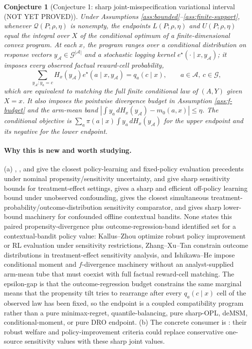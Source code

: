 \documentclass[11pt]{article}
\theoremstyle{definition}
\theoremstyle{plain}
\newtheorem{conjecture}{Conjecture}
\theoremstyle{remark}
\begin{document}
\begin{conjecture}[Conjecture 1: sharp joint-misspecification variational interval (NOT YET PROVED)]\label{conj:sharp-interval}
Under Assumptions \ref{ass:bounded}--\ref{ass:finite-support}, whenever $\mathcal Q(P;\rho,\eta)$ is nonempty, the endpoints $L(P;\rho,\eta)$ and $U(P;\rho,\eta)$ equal the integral over $X$ of the conditional optimum of a finite-dimensional convex program. At each $x$, the program ranges over a conditional distribution on response vectors $y_{\mathcal A}\in\mathcal G^{|\mathcal A|}$ and a stochastic logging kernel $e^\star(\cdot\mid x,y_{\mathcal A})$; it imposes every observed factual reward-cell probability,
\[
  \sum_{y_{\mathcal A}:y_a=c}
    H_x(y_{\mathcal A})e^\star(a\mid x,y_{\mathcal A})
  =q_a(c\mid x),
  \qquad a\in\mathcal A,\ c\in\mathcal G,
\]
which are equivalent to matching the full finite conditional law of $(A,Y)$ given $X=x$. It also imposes the pointwise divergence budget in Assumption \ref{ass:f-budget} and the arm-mean band
$|\int y_a\,dH_x(y_{\mathcal A})-m_0(a,x)|\le\eta$. The conditional objective is
$\sum_a\pi(a\mid x)\int y_a\,dH_x(y_{\mathcal A})$ for the upper endpoint and its negative for the lower endpoint.
\end{conjecture}
\paragraph{Why this is new and worth studying.}
(a) \citet{KallusZhou2018}, \citet{KallusZhou2020}, and \citet{KallusZhou2021} give the closest policy-learning and fixed-policy evaluation precedents under nominal propensity/sensitivity uncertainty, \citet{DornGuo2023} and \citet{DornGuoKallus2025} give sharp sensitivity bounds for treatment-effect settings, \citet{HessFrauenMelnychukFeuerriegel2026} gives a sharp and efficient off-policy learning bound under unobserved confounding, \citet{ZhangXuTan2025} gives the closest simultaneous treatment-probability/outcome-distribution sensitivity comparator, and \citet{IshikawaHe2023} gives sharp lower-bound machinery for confounded offline contextual bandits. None states this paired propensity-divergence plus outcome-regression-band identified set for a contextual-bandit policy value: Kallus--Zhou optimize robust policy improvement or RL evaluation under sensitivity restrictions, Zhang--Xu--Tan constrain outcome distributions in treatment-effect sensitivity analysis, and Ishikawa--He impose conditional moment and $f$-divergence machinery without an analyst-supplied arm-mean tube that must coexist with full factual reward-cell matching. The epsilon-gap is that the outcome-regression budget constrains the same marginal means that the propensity tilt tries to rearrange after every $q_a(c\mid x)$ cell of the observed law has been fixed, so the endpoint is a coupled compatibility program rather than a pure minimax-regret, quantile-balancing, pure sharp-OPL, deMSM, conditional-moment, or pure DRO endpoint. (b) The concrete consumer is \citet{JinXuZhengZhou2025}: their robust welfare and policy-improvement criteria could replace conservative one-source sensitivity values with these sharp joint values.
\end{document}
